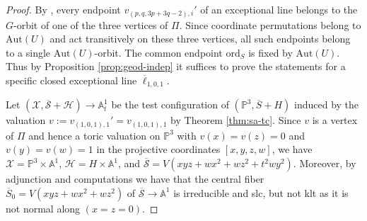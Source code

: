 \documentclass[reqno, 12pt]{amsart}
\theoremstyle{definition}
\newcommand{\bP}{\mathbb{P}}
\newcommand{\bA}{\mathbb{A}}
\newcommand{\bQ}{\mathbb{Q}}
\newcommand{\bZ}{\mathbb{Z}}
\newcommand{\bN}{\mathbb{N}}
\newcommand{\bk}{\mathbbm{k}}
\newcommand{\cX}{\mathcal{X}}
\newcommand{\cO}{\mathcal{O}}
\newcommand{\cF}{\mathcal{F}}
\newcommand{\cR}{\mathcal{R}}
\newcommand{\cH}{\mathcal{H}}
\newcommand{\Aut}{\mathrm{Aut}}
\newcommand{\ord}{\mathrm{ord}}
\newcommand{\Proj}{\mathrm{Proj}}
\newcommand{\fX}{\mathfrak{X}}
\newcommand{\fH}{\mathfrak{H}}
\newcommand{\oS}{\overline{S}}
\newcommand{\oell}{\overline{\ell}}
\newcommand{\ocS}{\overline{\mathcal{S}}}
\newcommand{\ofS}{\overline{\mathfrak{S}}}
\numberwithin{equation}{section}
\newcommand{\YL}[1]{{\textcolor{blue}{[Yuchen: #1]}}}
\begin{document}
\begin{proof}
By \cite[Theorem 9.3 and Proposition 9.4]{Jan23}, every endpoint $v_{(p,q,3p+3q-2),i}'$ of an exceptional line belongs to the $G$-orbit of one of the three vertices of $\Pi$. Since coordinate permutations belong to $\Aut(U)$ and act transitively on these three vertices, all such endpoints belong to a single $\Aut(U)$-orbit. The common endpoint $\ord_S$ is fixed by $\Aut(U)$. Thus by Proposition \ref{prop:geod-indep} it suffices to prove the statements for a specific closed exceptional line  $\oell_{1,0,1}$. 

Let $(\cX, \ocS + \cH)\to \bA^1_t$ be the test configuration of $(\bP^3,\oS + H)$ induced by the valuation $v:=v_{(1,0,1),1}' = v_{(1,0,1),1}$ by Theorem \ref{thm:sa-tc}. Since $v$ is a vertex of $\Pi$ and hence a toric valuation on $\bP^3$ with $v(x) = v(z) = 0$ and $v(y)=v(w)=1$ in the projective coordinates $[x,y,z,w]$, we have $\cX = \bP^3 \times \bA^1$, $\cH = H \times \bA^1$, and $\ocS = V(xyz+wx^2+ wz^2+t^2 wy^2)$. Moreover, by adjunction and computations we have that the central fiber $\oS_0 = V(xyz+wx^2+wz^2) $ of $\ocS \to \bA^1$ is irreducible and slc, but not klt as it is not normal along $(x=z=0)$.

\end{proof}
\end{document}
